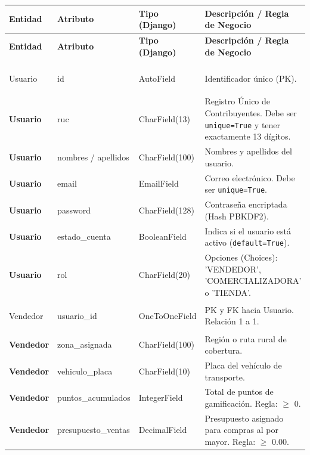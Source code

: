 \documentclass{article}
\begin{document}
\begin{longtable}{|>{\bfseries}p{3.2cm}|p{3.5cm}|p{2.8cm}|p{5.5cm}|}
\hline
\rowcolor[gray]{0.9} 
\textbf{Entidad} & \textbf{Atributo} & \textbf{Tipo (Django)} & \textbf{Descripción / Regla de Negocio} \\ \hline
\endfirsthead

\hline
\rowcolor[gray]{0.9} 
\textbf{Entidad} & \textbf{Atributo} & \textbf{Tipo (Django)} & \textbf{Descripción / Regla de Negocio} \\ \hline
\endhead

\hline \multicolumn{4}{|r|}{{Continúa en la siguiente página...}} \\ \hline
\endfoot

\hline
\endlastfoot

Usuario & id & AutoField & Identificador único (PK). \\ \hline
Usuario & ruc & CharField(13) & Registro Único de Contribuyentes. Debe ser \texttt{unique=True} y tener exactamente 13 dígitos. \\ \hline
Usuario & nombres / apellidos & CharField(100) & Nombres y apellidos del usuario. \\ \hline
Usuario & email & EmailField & Correo electrónico. Debe ser \texttt{unique=True}. \\ \hline
Usuario & password & CharField(128) & Contraseña encriptada (Hash PBKDF2). \\ \hline
Usuario & estado\_cuenta & BooleanField & Indica si el usuario está activo (\texttt{default=True}). \\ \hline
Usuario & rol & CharField(20) & Opciones (Choices): 'VENDEDOR', 'COMERCIALIZADORA' o 'TIENDA'. \\ \hline

Vendedor & usuario\_id & OneToOneField & PK y FK hacia Usuario. Relación 1 a 1. \\ \hline
Vendedor & zona\_asignada & CharField(100) & Región o ruta rural de cobertura. \\ \hline
Vendedor & vehiculo\_placa & CharField(10) & Placa del vehículo de transporte. \\ \hline
Vendedor & puntos\_acumulados & IntegerField & Total de puntos de gamificación. Regla: $\ge$ 0. \\ \hline
Vendedor & presupuesto\_ventas & DecimalField & Presupuesto asignado para compras al por mayor. Regla: $\ge$ 0.00. \\ \hline


\end{longtable}
\end{document}
